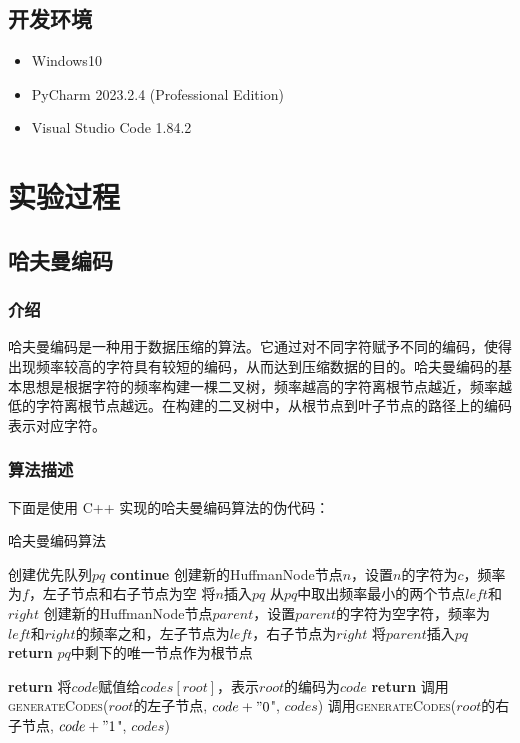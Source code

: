\documentclass[lang=cn,11pt,a4paper]{elegantpaper}
\begin{document}
\subsection{开发环境}

\begin{itemize}
    \item Windows10
    \item PyCharm 2023.2.4 (Professional Edition)
    \item Visual Studio Code 1.84.2
\end{itemize}

\section{实验过程}

\subsection{哈夫曼编码}

\subsubsection{介绍}
哈夫曼编码是一种用于数据压缩的算法。它通过对不同字符赋予不同的编码，使得出现频率较高的字符具有较短的编码，从而达到压缩数据的目的。哈夫曼编码的基本思想是根据字符的频率构建一棵二叉树，频率越高的字符离根节点越近，频率越低的字符离根节点越远。在构建的二叉树中，从根节点到叶子节点的路径上的编码表示对应字符。

\subsubsection{算法描述}
下面是使用 C++ 实现的哈夫曼编码算法的伪代码：

\begin{algorithm}[H]
\caption{哈夫曼编码算法}\label{huffman}
\begin{algorithmic}[1]
    \State 创建优先队列$pq$
            \State \textbf{continue}
        \EndIf
        \State 创建新的HuffmanNode节点$n$，设置$n$的字符为$c$，频率为$f$，左子节点和右子节点为空
        \State 将$n$插入$pq$
    \EndFor
        \State 从$pq$中取出频率最小的两个节点$left$和$right$
        \State 创建新的HuffmanNode节点$parent$，设置$parent$的字符为空字符，频率为$left$和$right$的频率之和，左子节点为$left$，右子节点为$right$
        \State 将$parent$插入$pq$
    \EndWhile
    \State \textbf{return} $pq$中剩下的唯一节点作为根节点
\EndProcedure

        \State \textbf{return}
    \EndIf
        \State 将$code$赋值给$codes[root]$，表示$root$的编码为$code$
        \State \textbf{return}
    \EndIf
    \State 调用\textsc{generateCodes}($root$的左子节点, $code + "0$", $codes$)
    \State 调用\textsc{generateCodes}($root$的右子节点, $code + "1$", $codes$)
\EndProcedure
\end{algorithmic}
\end{algorithm}
\end{document}
